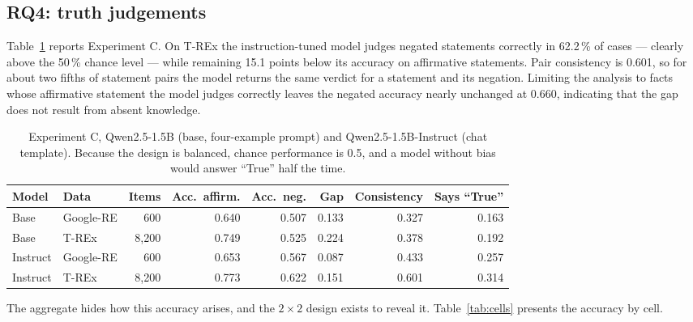 \documentclass{article}
\begin{document}
\subsection{RQ4: truth judgements}
\label{sec:results-truth}

Table~\ref{tab:truth} reports Experiment C. On T-REx the instruction-tuned model judges
negated statements correctly in 62.2\,\% of cases --- clearly above the 50\,\% chance level --- while remaining 15.1 points below its accuracy on affirmative
statements. Pair consistency is 0.601, so for about two fifths of statement pairs the model returns the same
verdict for a statement and its negation. Limiting the analysis to facts whose affirmative statement the model judges correctly leaves the negated accuracy nearly unchanged at 0.660, indicating that the gap does not result from absent knowledge.

\begin{table}[t]
\centering\small
\caption{Experiment C, Qwen2.5-1.5B (base, four-example prompt) and Qwen2.5-1.5B-Instruct (chat template). Because the design is balanced, chance performance is 0.5, and a model without bias would answer ``True'' half the time.}
\label{tab:truth}
\begin{tabular}{llrrrrrr}
\toprule
Model & Data & Items & Acc.\ affirm. & Acc.\ neg. & Gap & Consistency & Says ``True'' \\
\midrule
Base     & Google-RE & 600     & 0.640 & 0.507 & 0.133 & 0.327 & 0.163 \\
Base     & T-REx     & 8{,}200 & 0.749 & 0.525 & 0.224 & 0.378 & 0.192 \\
Instruct & Google-RE & 600     & 0.653 & 0.567 & 0.087 & 0.433 & 0.257 \\
Instruct & T-REx     & 8{,}200 & 0.773 & 0.622 & 0.151 & 0.601 & 0.314 \\
\bottomrule
\end{tabular}
\end{table}



The aggregate hides how this accuracy arises, and the $2\times2$ design exists to reveal it. Table~\ref{tab:cells} presents the accuracy by cell.
\end{document}
